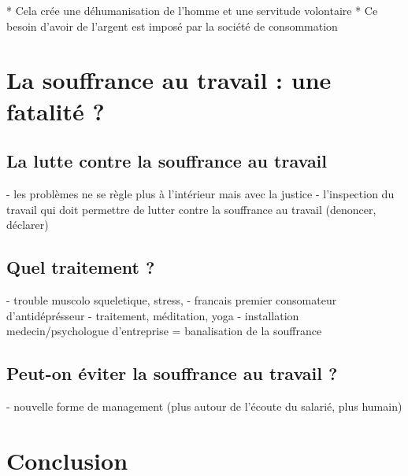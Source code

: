 \documentclass{report}
\begin{document}
	* Cela crée une déhumanisation de l'homme et une servitude volontaire
	* Ce besoin d'avoir de l'argent est imposé par la société de consommation
\chapter{La souffrance au travail : une fatalité ?}
	\section{La lutte contre la souffrance au travail}
		- les problèmes ne se règle plus à l'intérieur mais avec la justice
		- l'inspection du travail qui doit permettre de lutter contre la souffrance au travail (denoncer, déclarer)
	\section{Quel traitement ?}
		- trouble muscolo squeletique, stress, 
		- francais premier consomateur d'antidéprésseur
		- traitement, méditation, yoga
		- installation medecin/psychologue d'entreprise = banalisation de la souffrance
	\section{Peut-on éviter la souffrance au travail ?}
    	- nouvelle forme de management (plus autour de l'écoute du salarié, plus humain)
\chapter*{Conclusion}
    \paragraph*{}
         
\end{document}
